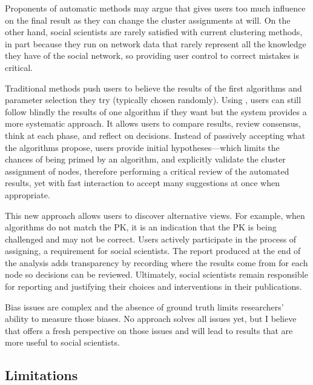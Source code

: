 Proponents of automatic methods may argue that \pkclustering gives users too much influence on the final result as they can change the cluster assignments at will. On the other hand, social scientists are rarely satisfied with current clustering methods, in part because they run on network data that rarely represent all the knowledge they have of the social network, so providing user control to correct mistakes is critical.

Traditional methods push users to believe the results of the first algorithms and parameter selection they try (typically chosen randomly). Using \pkclustering, users can still follow blindly the results of one algorithm if they want but the system provides a more systematic approach. It allows users to compare results, review consensus, think at each phase, and reflect on decisions. Instead of passively accepting what the algorithms propose, users provide initial hypotheses---which limits the chances of being primed by an algorithm, and explicitly validate the cluster assignment of nodes, therefore performing a critical review of the automated results, yet with fast interaction to accept many suggestions at once when appropriate.

This new approach allows users to discover alternative views. For example, when algorithms do not match the PK, it is an indication that the PK is being challenged and may not be correct.  Users actively participate in the process of assigning, a requirement for social scientists. The report produced at the end of the analysis adds transparency by recording where the results come from for each node so decisions can be reviewed. Ultimately, social scientists remain responsible for reporting and justifying their choices and interventions in their publications.

Bias issues are complex and the absence of ground truth limits researchers' ability to measure those biases. No approach solves all issues yet, but I believe that \pkclustering offers a fresh perspective on those issues and will lead to results that are more useful to social scientists.

\subsection{Limitations}

